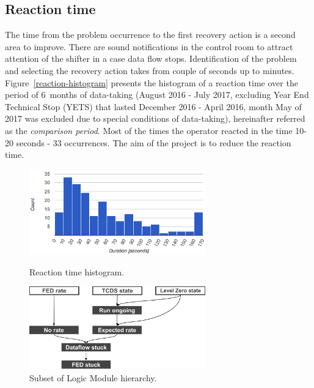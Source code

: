 \documentclass[a4paper]{jpconf}
\begin{document}
\subsection{Reaction time} \label{reaction-section}
The time from the problem occurrence to the first recovery action is a second area to improve. There are sound notifications in the control room to attract attention of the shifter in a case data flow stops. Identification of the problem and selecting the recovery action takes from couple of seconds up to minutes. Figure~\ref{reaction-histogram} presents the histogram of a reaction time over the period of 6~months of data-taking (August 2016 - July 2017, excluding Year End Technical Stop (YETS) that lasted December 2016 - April 2016, month May of 2017 was excluded due to special conditions of data-taking), hereinafter referred as the {\it comparison period}. Most of the times the operator reacted in the time 10-20 seconds - 33 occurrences. The aim of the project is to reduce the reaction time.

\begin{figure}[h]
\begin{minipage}{18pc}
\includegraphics[width=18pc]{reaction-histogram.png}
\caption{\label{reaction-histogram}Reaction time histogram.}
\end{minipage}\hspace{2pc}%
\begin{minipage}{18pc}
\includegraphics[width=18pc]{logic-module-hierarchy.png}
\caption{\label{subsetoflm}Subset of Logic Module hierarchy.}
\end{minipage} 
\end{figure}
\end{document}

